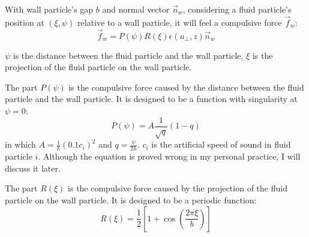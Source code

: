 \begin{figure}[H]
    \centering
\end{figure}

With wall particle's gap $b$ and normal vector $\vec{n}_w$, 
considering a fluid particle's position at $(\xi, \psi)$ relative to a wall particle, 
it will feel a compulsive force $\vec{f}_w$:
\begin{equation}
    \vec{f}_w=P(\psi)R(\xi)\epsilon(u_{\perp},z)\vec{n}_w
\end{equation}

$\psi$ is the distance between the fluid particle and the wall particle,
$\xi$ is the projection of the fluid particle on the wall particle.

The part $P(\psi)$ is the compulsive force caused by the distance between the fluid particle and the wall particle.
It is designed to be a function with singularity at $\psi=0$:
\begin{equation}
    P(\psi)=A\frac{1}{\sqrt{q}}(1-q)
\end{equation}
in which $A=\frac{1}{h}(0.1c_i)^2$ and $q=\frac{\psi}{2h}$.
$c_i$ is the artificial speed of sound in fluid particle $i$.
Although the equation is proved wrong in my personal practice, 
I will discuss it later.

The part $R(\xi)$ is the compulsive force caused by the projection of the fluid particle on the wall particle.
It is designed to be a periodic function:
\begin{equation}
    R(\xi)=\frac{1}{2}\left[
        1+\cos\left(\frac{2\pi\xi}{b}\right)
    \right]
\end{equation}

